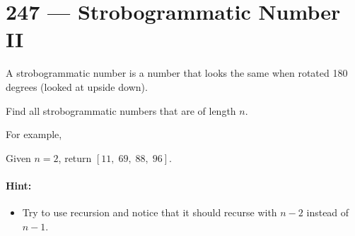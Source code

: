 \section{247 --- Strobogrammatic Number II}
A strobogrammatic number is a number that looks the same when rotated 180 degrees (looked at upside down).
\par
Find all strobogrammatic numbers that are of length $n$.
\par
For example,
\par
Given $n = 2$, return $[11,\;69,\;88,\;96]$.
\par
\paragraph{Hint:}
\begin{itemize}
\item Try to use recursion and notice that it should recurse with $n - 2$ instead of $n - 1$.
\end{itemize}
